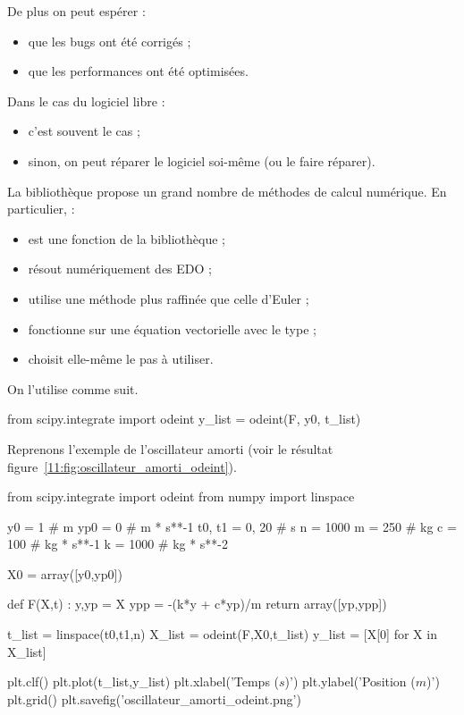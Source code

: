 \clearslide{}

De plus on peut espérer :
\begin{itemize}
\item que les bugs ont été corrigés ;
\item que les performances ont été optimisées.
\end{itemize}

Dans le cas du logiciel libre :
\begin{itemize}
\item c'est souvent le cas ; 
\item sinon, on peut réparer le logiciel soi-même (ou le faire réparer).
\end{itemize}

\clearslide{}
La bibliothèque  propose un grand nombre de méthodes de calcul numérique. En particulier,  :
\begin{itemize}
\item est une fonction de la bibliothèque  ;
\item résout numériquement des EDO ;
\item utilise une méthode plus raffinée que celle d'Euler ;
\item fonctionne sur une équation vectorielle avec le type  ;
\item choisit elle-même le pas à utiliser.
\end{itemize}

\clearslide{}
On l'utilise comme suit.
\begin{pyverbatim}
from scipy.integrate import odeint
y_list = odeint(F, y0, t_list)
\end{pyverbatim}

\clearslide{}
Reprenons l'exemple de l'oscillateur amorti (voir le résultat figure~\ref{11:fig:oscillateur_amorti_odeint}).
\begin{pyverbatim}
from scipy.integrate import odeint
from numpy import linspace

y0 = 1 # m
yp0 = 0 # m * s**-1
t0, t1 = 0, 20 # s
n = 1000
m = 250 # kg
c = 100 # kg * s**-1
k = 1000 # kg * s**-2

X0 = array([y0,yp0])

def F(X,t) :
    y,yp = X
    ypp = -(k*y + c*yp)/m
    return array([yp,ypp])

t_list = linspace(t0,t1,n)
X_list = odeint(F,X0,t_list)
y_list = [X[0] for X in X_list]

plt.clf()
plt.plot(t_list,y_list)
plt.xlabel('Temps ($s$)')
plt.ylabel('Position ($m$)')
plt.grid()
plt.savefig('oscillateur_amorti_odeint.png')
\end{pyverbatim}



